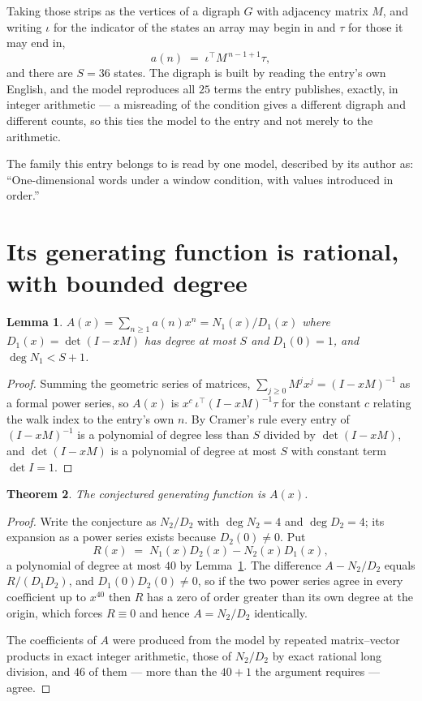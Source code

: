 \documentclass[11pt,a4paper]{article}
\theoremstyle{plain}
\newtheorem{theorem}{Theorem}
\newtheorem{lemma}[theorem]{Lemma}
\theoremstyle{definition}
\begin{document}
Taking those strips as the vertices of a digraph $G$ with adjacency matrix $M$, and writing
$\iota$ for the indicator of the states an array may begin in and $\tau$ for those it may end
in,
\[
a(n)\;=\;\iota^{\!\top}M^{\,n-1+1}\tau ,
\]
and there are $S=36$ states. The digraph is built by reading the entry's own English, and the
model reproduces all $25$ terms the entry publishes, exactly, in integer arithmetic --- a
misreading of the condition gives a different digraph and different counts, so this ties the
model to the entry and not merely to the arithmetic.

The family this entry belongs to is read by one model, described by its author as: ``One-dimensional words under a window condition, with values introduced in order.''


\section{Its generating function is rational, with bounded degree}

\begin{lemma}\label{lem:rat}
$A(x)=\sum_{n\ge1}a(n)x^n=N_1(x)/D_1(x)$ where $D_1(x)=\det(I-xM)$ has degree at most
$S$ and $D_1(0)=1$, and $\deg N_1<S+1$.
\end{lemma}

\begin{proof}
Summing the geometric series of matrices, $\sum_{j\ge0}M^jx^j=(I-xM)^{-1}$ as a formal
power series, so $A(x)$ is $x^{c}\,\iota^{\!\top}(I-xM)^{-1}\tau$ for the constant $c$
relating the walk index to the entry's own $n$. By Cramer's rule every entry of
$(I-xM)^{-1}$ is a polynomial of degree less than $S$ divided by $\det(I-xM)$, and
$\det(I-xM)$ is a polynomial of degree at most $S$ with constant term $\det I=1$.
\end{proof}

\begin{theorem}
The conjectured generating function is $A(x)$.
\end{theorem}

\begin{proof}
Write the conjecture as $N_2/D_2$ with $\deg N_2=4$ and $\deg D_2=4$; its expansion as a
power series exists because $D_2(0)\neq0$. Put
\[
R(x)\;=\;N_1(x)D_2(x)-N_2(x)D_1(x),
\]
a polynomial of degree at most $40$ by Lemma~\ref{lem:rat}. The difference
$A-N_2/D_2$ equals $R/(D_1D_2)$, and $D_1(0)D_2(0)\neq0$, so if the two power series agree in
every coefficient up to $x^{40}$ then $R$ has a zero of order greater than its own
degree at the origin, which forces $R\equiv0$ and hence $A=N_2/D_2$ identically.

The coefficients of $A$ were produced from the model by repeated matrix--vector products in
exact integer arithmetic, those of $N_2/D_2$ by exact rational long division, and $46$
of them --- more than the $40+1$ the argument requires --- agree.
\end{proof}
\end{document}
